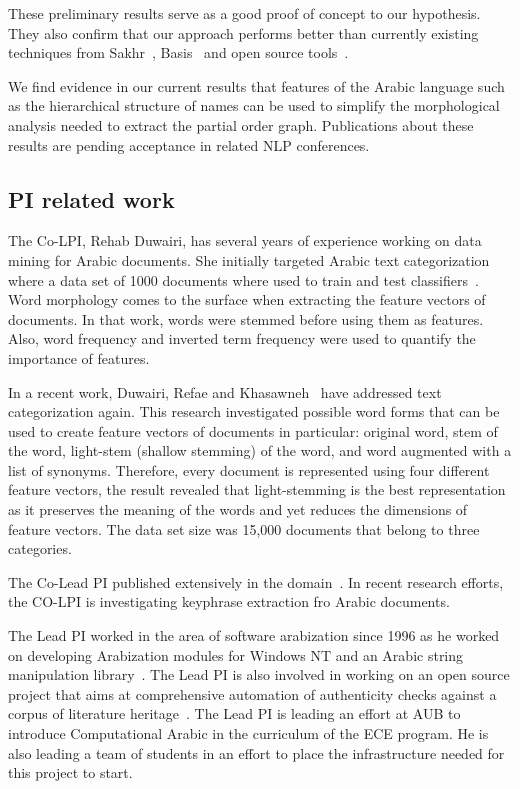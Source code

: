 \documentclass[12pt]{article}
\begin{document}
{These preliminary results serve as a good proof of concept to our 
hypothesis. They also confirm that our approach performs better than 
currently existing techniques from Sakhr~\cite{Sak09},
Basis~\cite{Bas09} and open source 
tools~\cite{Col09,Otakar:07,Tim04}.

We find evidence in our current results that features 
of the Arabic language such as the hierarchical structure of
names can be used to simplify the morphological analysis
needed to extract the partial order graph. 
Publications about these results are pending acceptance in 
related NLP conferences. 

\subsection{PI related work}

The Co-LPI, Rehab Duwairi, has several years of experience 
working on data mining for Arabic documents. 
She initially targeted Arabic text categorization where a 
data set of 1000 documents where used to train and test 
classifiers~\cite{Duw06,Duw07}.
Word morphology comes to the surface when extracting the 
feature vectors of documents. 
In that work, words were stemmed before using them as features. 
Also, word frequency and inverted term frequency were used to 
quantify the importance of features. 

In a recent work, Duwairi, Refae and Khasawneh~\cite{Duw09}
have addressed text categorization again. 
This research investigated possible word forms that can be 
used to create feature vectors of documents in particular: 
original word, stem of the word, light-stem (shallow stemming) 
of the word, and word augmented with a list of synonyms. 
Therefore, every document is represented using four different 
feature vectors, the result revealed that light-stemming is the 
best representation as it preserves the meaning of the words 
and yet reduces the dimensions of feature vectors. 
The data set size was 15,000 documents that belong to three 
categories. 

The Co-Lead PI published extensively in the 
domain~\cite{Duw06, Duw07, Duw09}.
In recent research efforts, the CO-LPI is investigating 
keyphrase extraction fro Arabic documents.

The Lead PI worked in the area of software arabization since 1996 
as he worked on developing Arabization modules for Windows NT 
and an Arabic string manipulation library~\cite{Zar96}. 
The Lead PI is also involved in working on an open source 
project that aims at comprehensive automation of authenticity 
checks against a corpus of literature heritage~\cite{Zar06}.
The Lead PI is leading an effort at AUB to introduce 
Computational Arabic in the curriculum of the ECE program. 
He is also leading a team of students in an effort to place 
the infrastructure needed for this project to start. 

}
\end{document}
